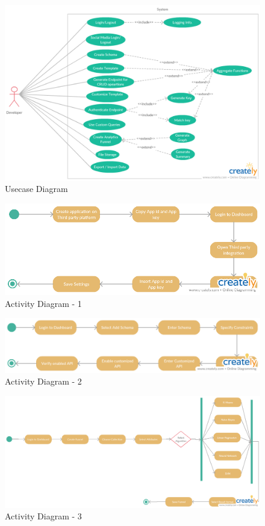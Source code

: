 \documentclass[a4paper,12pt]{report}
\begin{document}
        \begin{figure}[h]
          \includegraphics[width=8.5in, angle=90]{images/usecase.png}
        \caption{ Usecase Diagram}  
        \end{figure}

        \begin{figure}[h]
          \includegraphics[width=1\textwidth]{images/PPI-2.png}
          \caption{ Activity Diagram - 1}  
        \end{figure}

        \begin{figure}[h]
          \includegraphics[width=1\textwidth]{images/PPI-3.png}
          \caption{ Activity Diagram - 2}  
        \end{figure}

        \begin{figure}[h]
          \includegraphics[width=1\textwidth]{images/PPI.png}
          \caption{ Activity Diagram - 3}  
        \end{figure}
\end{document}

